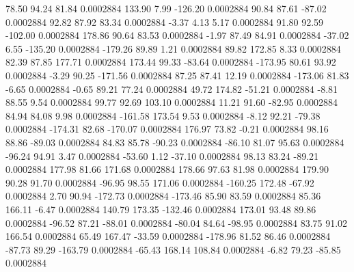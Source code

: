        78.50       94.24       81.84     0.0002884
      133.90        7.99     -126.20     0.0002884
       90.84       87.61      -87.02     0.0002884
       92.82       87.92       83.34     0.0002884
       -3.37        4.13        5.17     0.0002884
       91.80       92.59     -102.00     0.0002884
      178.86       90.64       83.53     0.0002884
       -1.97       87.49       84.91     0.0002884
      -37.02        6.55     -135.20     0.0002884
     -179.26       89.89        1.21     0.0002884
       89.82      172.85        8.33     0.0002884
       82.39       87.85      177.71     0.0002884
      173.44       99.33      -83.64     0.0002884
     -173.95       80.61       93.92     0.0002884
       -3.29       90.25     -171.56     0.0002884
       87.25       87.41       12.19     0.0002884
     -173.06       81.83       -6.65     0.0002884
       -0.65       89.21       77.24     0.0002884
       49.72      174.82      -51.21     0.0002884
       -8.81       88.55        9.54     0.0002884
       99.77       92.69      103.10     0.0002884
       11.21       91.60      -82.95     0.0002884
       84.94       84.08        9.98     0.0002884
     -161.58      173.54        9.53     0.0002884
       -8.12       92.21      -79.38     0.0002884
     -174.31       82.68     -170.07     0.0002884
      176.97       73.82       -0.21     0.0002884
       98.16       88.86      -89.03     0.0002884
       84.83       85.78      -90.23     0.0002884
      -86.10       81.07       95.63     0.0002884
      -96.24       94.91        3.47     0.0002884
      -53.60        1.12      -37.10     0.0002884
       98.13       83.24      -89.21     0.0002884
      177.98       81.66      171.68     0.0002884
      178.66       97.63       81.98     0.0002884
      179.90       90.28       91.70     0.0002884
      -96.95       98.55      171.06     0.0002884
     -160.25      172.48      -67.92     0.0002884
        2.70       90.94     -172.73     0.0002884
     -173.46       85.90       83.59     0.0002884
       85.36      166.11       -6.47     0.0002884
      140.79      173.35     -132.46     0.0002884
      173.01       93.48       89.86     0.0002884
      -96.52       87.21      -88.01     0.0002884
      -80.04       84.64      -98.95     0.0002884
       83.75       91.02      166.54     0.0002884
       65.49      167.47      -33.59     0.0002884
     -178.96       81.52       86.46     0.0002884
      -87.73       89.29     -163.79     0.0002884
      -65.43      168.14      108.84     0.0002884
       -6.82       79.23      -85.85     0.0002884
